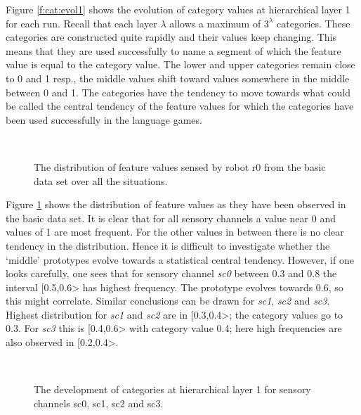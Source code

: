 Figure \ref{f:cat:evol1} shows the evolution of category values at hierarchical layer 1 for each run. Recall that each layer $\lambda$ allows a maximum of $3^\lambda$ categories. These categories are constructed quite rapidly and their values keep changing. This means that they are used successfully to name a segment of which the feature value is equal to the category value. The lower and upper categories remain close to 0 and 1 resp., the middle values shift toward values somewhere in the middle between 0 and 1. The categories have the tendency to move towards what could be called the central tendency of the feature values for which the categories have been used successfully in the language games. 


\begin{figure}
\centering
{}
\\
\caption{The distribution of feature values sensed by robot r0 from the basic data set over all the situations.}
\label{f:cat:distr}
\end{figure}

Figure \ref{f:cat:distr} shows the distribution of feature values as they have been observed in the basic data set. It is clear that for all sensory channels a value near 0 and values of 1 are most frequent. For the other values in between there is no clear tendency in the distribution. Hence it is difficult to investigate whether the `middle' prototypes evolve towards a statistical central tendency. However, if one looks carefully, one sees that for sensory channel {\em sc0} between 0.3 and 0.8 the interval [0.5,0.6> has highest frequency. The prototype evolves towards 0.6, so this might correlate. Similar conclusions can be drawn for {\em sc1}, {\em sc2} and {\em sc3}. Highest distribution for {\em sc1} and {\em sc2} are in [0.3,0.4>; the category values go to 0.3. For {\em sc3} this is [0.4,0.6> with category value 0.4; here high frequencies are also observed in [0.2,0.4>.

\begin{figure}
\centering
{}
\\
\caption{The development of categories at hierarchical layer 1 for sensory channels sc0, sc1, sc2 and sc3.}
\label{f:cat:evol2}
\end{figure}

